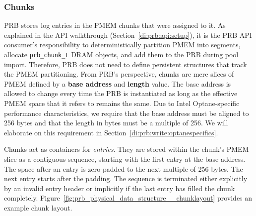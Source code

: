 \documentclass[12pt,a4paper,twoside]{book}
\begin{document}

\subsubsection{Chunks}\label{di:prb:persistent:chunks}
PRB stores log entries in the PMEM chunks that were assigned to it.
As explained in the API walkthrough (Section~\ref{di:prb:api:setup}), it is the PRB API consumer's responsibility to deterministically partition PMEM into segments, allocate \lstinline{prb_chunk_t} DRAM objects, and add them to the PRB during pool import.
Therefore, PRB does not need to define persistent structures that track the PMEM partitioning.
From PRB's perspective, chunks are mere slices of PMEM defined by a \textbf{base address} and \textbf{length} value.
The base address is allowed to change every time the PRB is instantiated as long as the effective PMEM space that it refers to remains the same.
Due to Intel Optane-specific performance characteristics, we require that the base address must be aligned to 256 bytes and that the length in bytes must be a multiple of 256.
We will elaborate on this requirement in Section~\ref{di:prb:write:optanespecifics}.

Chunks act as containers for \textit{entries}.
They are stored within the chunk's PMEM slice as a contiguous sequence, starting with the first entry at the base address.
The space after an entry is zero-padded to the next multiple of 256 bytes.
The next entry starts after the padding.
The sequence is terminated either explicitly by an invalid entry header or implicitly if the last entry has filled the chunk completely.
Figure~\ref{fig:prb_physical_data_structure__chunklayout} provides an example chunk layout.
\end{document}
